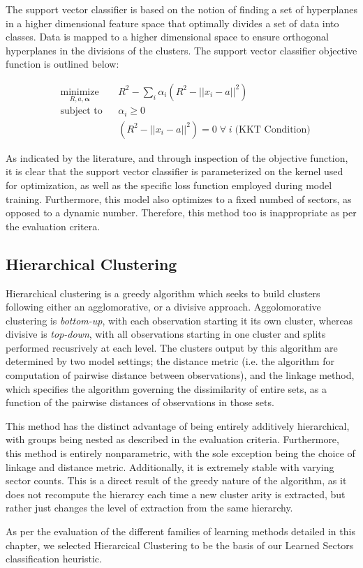 \documentclass[../main.tex]{subfiles}
\begin{document}
The support vector classifier is based on the notion of finding a set of hyperplanes in a higher dimensional feature space that optimally divides a set of data into classes. Data is mapped to a higher dimensional space to ensure orthogonal hyperplanes in the divisions of the clusters. The support vector classifier objective function is outlined below:

\begin{equation*}
    \begin{aligned}
        & \underset{R, a, \boldsymbol{\alpha}}{\text{minimize}} & & R^2 - \sum_i \alpha_i (R^2 - ||x_i - a||^2) \\
        & \text{subject to}
        & & \alpha_i \geq 0 \\
        & & & (R^2 - ||x_i - a||^2) = 0 \; \forall \; i \; \text{(KKT Condition)}
    \end{aligned}
\end{equation*}

As indicated by the literature, and through inspection of the objective function, it is clear that the support vector classifier is parameterized on the kernel used for optimization, as well as the specific loss function employed during model training. Furthermore, this model also optimizes to a fixed numbed of sectors, as opposed to a dynamic number. Therefore, this method too is inappropriate as per the evaluation critera.

\subsection{Hierarchical Clustering}

Hierarchical clustering is a greedy algorithm which seeks to build clusters following either an agglomorative, or a divisive approach. Aggolomorative clustering is \textit{bottom-up}, with each observation starting it its own cluster, whereas divisive is \textit{top-down}, with all observations starting in one cluster and splits performed recusrively at each level. The clusters output by this algorithm are determined by two model settings; the distance metric (i.e. the algorithm for computation of pairwise distance between observations), and the linkage method, which specifies the algorithm governing the dissimilarity of entire sets, as a function of the pairwise distances of observations in those sets.

This method has the distinct advantage of being entirely additively hierarchical, with groups being nested as described in the evaluation criteria. Furthermore, this method is entirely nonparametric, with the sole exception being the choice of linkage and distance metric. Additionally, it is extremely stable with varying sector counts. This is a direct result of the greedy nature of the algorithm, as it does not recompute the hierarcy each time a new cluster arity is extracted, but rather just changes the level of extraction from the same hierarchy.

As per the evaluation of the different families of learning methods detailed in this chapter, we selected Hierarcical Clustering to be the basis of our Learned Sectors classification heuristic.
\end{document}
